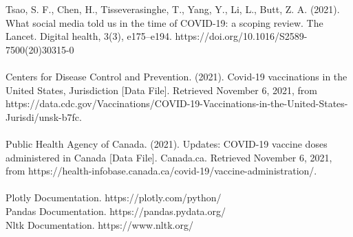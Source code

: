 \documentclass[fontsize=11pt]{article}
\begin{document}
\begin{spverbatim}
Tsao, S. F., Chen, H., Tisseverasinghe, T., Yang, Y., Li, L.,  Butt, Z. A. (2021).  What social media told us in the time of COVID-19:  a scoping review.  The Lancet.  Digital health, 3(3), e175–e194. https://doi.org/10.1016/S2589-7500(20)30315-0 \\\\

Centers for Disease Control and Prevention.  (2021).  Covid-19 vaccinations in the United States,  Jurisdiction [Data File].  Retrieved November 6, 2021, from
https://data.cdc.gov/Vaccinations/COVID-19-Vaccinations-in-the-United-States-Jurisdi/unsk-b7fc. \\\\

Public Health Agency of Canada.  (2021).  Updates: COVID-19 vaccine doses administered in Canada [Data File]. Canada.ca.  Retrieved November 6, 2021, from
https://health-infobase.canada.ca/covid-19/vaccine-administration/. \\\\

Plotly Documentation.  https://plotly.com/python/ \\
Pandas Documentation.  https://pandas.pydata.org/ \\
Nltk Documentation. https://www.nltk.org/ \\

\end{spverbatim}
\end{document}

